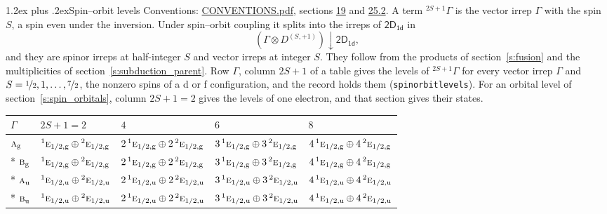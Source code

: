 \documentclass[10pt,a4paper]{article}
\makeatletter
\renewcommand\section{\@startsection{section}{1}{\z@}{-3ex plus -1ex minus -.2ex}%
  {1.2ex plus .2ex}{\normalfont\large\sffamily\bfseries\color{parttitle}}}
\numberwithin{equation}{section}
\newcommand{\grp}[1]{\mathsf{#1}}
\newcommand{\irr}[1]{\text{\normalfont\scshape #1}}
\newcommand{\conjpair}[1]{{}^{#1}}
\newcommand{\ptag}[1]{\mathrm{#1}}
\newcommand{\restr}[2]{#1\!\downarrow#2}
\newcommand{\irrJp}[2]{D^{(#1,#2)}}
\newcommand{\irrprod}{\otimes}
\newcommand{\term}[2]{{}^{#1}#2}
\makeatother
\begin{document}
\section{Spin--orbit levels}\label{s:spin_orbit}
Conventions: \href{../../CONVENTIONS.pdf}{CONVENTIONS.pdf}, sections \href{../../../rotation/CONVENTIONS.pdf\#conv.19}{19} and \href{../../CONVENTIONS.pdf\#conv.25.2}{25.2}.
\leavevmode\label{n:local.spin}\label{n:symbol.term}A term $\term{2S+1}{\Gamma}$ is the vector irrep $\Gamma$ with the spin $S$, a spin even under the inversion. Under spin--orbit coupling it splits into the irreps of $\grp{2D_{1d}}$ in
\begin{equation}\label{e:spinorbit}\restr{(\Gamma \irrprod \irrJp{S}{+1})}{\grp{2D_{1d}}},\end{equation}
and they are spinor irreps at half-integer $S$ and vector irreps at integer $S$. They follow from the products of section~\ref{s:fusion} and the multiplicities of section~\ref{s:subduction_parent}. Row $\Gamma$, column $2S + 1$ of a table gives the levels of $\term{2S+1}{\Gamma}$ for every vector irrep $\Gamma$ and $S = \nicefrac{1}{2}, 1, \dots, \nicefrac{7}{2}$, the nonzero spins of a d or f configuration, and the record holds them (\texttt{spinorbitlevels}). For an orbital level of section~\ref{s:spin_orbitals}, column $2S + 1 = 2$ gives the levels of one electron, and that section gives their states.
{\small\setlength{\tabcolsep}{3pt}\begin{longtable}{@{}lllll@{}}\toprule
$\Gamma$ & $2S + 1 = 2$ & $4$ & $6$ & $8$\\\midrule\endhead
\bottomrule\endfoot\endlastfoot
$\irr{a}_{\ptag{g}}$ & $\conjpair{1}\irr{e}_{1/2,\ptag{g}}\oplus \conjpair{2}\irr{e}_{1/2,\ptag{g}}$ & $2\,\conjpair{1}\irr{e}_{1/2,\ptag{g}}\oplus 2\,\conjpair{2}\irr{e}_{1/2,\ptag{g}}$ & $3\,\conjpair{1}\irr{e}_{1/2,\ptag{g}}\oplus 3\,\conjpair{2}\irr{e}_{1/2,\ptag{g}}$ & $4\,\conjpair{1}\irr{e}_{1/2,\ptag{g}}\oplus 4\,\conjpair{2}\irr{e}_{1/2,\ptag{g}}$\\*
$\irr{b}_{\ptag{g}}$ & $\conjpair{1}\irr{e}_{1/2,\ptag{g}}\oplus \conjpair{2}\irr{e}_{1/2,\ptag{g}}$ & $2\,\conjpair{1}\irr{e}_{1/2,\ptag{g}}\oplus 2\,\conjpair{2}\irr{e}_{1/2,\ptag{g}}$ & $3\,\conjpair{1}\irr{e}_{1/2,\ptag{g}}\oplus 3\,\conjpair{2}\irr{e}_{1/2,\ptag{g}}$ & $4\,\conjpair{1}\irr{e}_{1/2,\ptag{g}}\oplus 4\,\conjpair{2}\irr{e}_{1/2,\ptag{g}}$\\*
$\irr{a}_{\ptag{u}}$ & $\conjpair{1}\irr{e}_{1/2,\ptag{u}}\oplus \conjpair{2}\irr{e}_{1/2,\ptag{u}}$ & $2\,\conjpair{1}\irr{e}_{1/2,\ptag{u}}\oplus 2\,\conjpair{2}\irr{e}_{1/2,\ptag{u}}$ & $3\,\conjpair{1}\irr{e}_{1/2,\ptag{u}}\oplus 3\,\conjpair{2}\irr{e}_{1/2,\ptag{u}}$ & $4\,\conjpair{1}\irr{e}_{1/2,\ptag{u}}\oplus 4\,\conjpair{2}\irr{e}_{1/2,\ptag{u}}$\\*
$\irr{b}_{\ptag{u}}$ & $\conjpair{1}\irr{e}_{1/2,\ptag{u}}\oplus \conjpair{2}\irr{e}_{1/2,\ptag{u}}$ & $2\,\conjpair{1}\irr{e}_{1/2,\ptag{u}}\oplus 2\,\conjpair{2}\irr{e}_{1/2,\ptag{u}}$ & $3\,\conjpair{1}\irr{e}_{1/2,\ptag{u}}\oplus 3\,\conjpair{2}\irr{e}_{1/2,\ptag{u}}$ & $4\,\conjpair{1}\irr{e}_{1/2,\ptag{u}}\oplus 4\,\conjpair{2}\irr{e}_{1/2,\ptag{u}}$\\
\bottomrule\end{longtable}}
\end{document}
